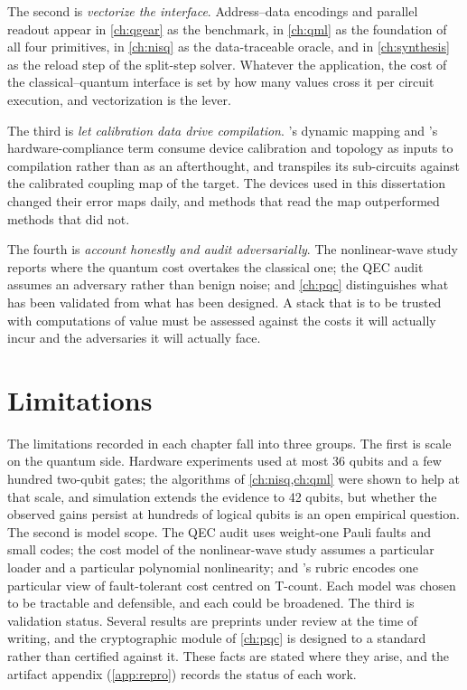 The second is \emph{vectorize the interface}. Address--data encodings and parallel readout appear in \cref{ch:qgear} as the \qcrank{} benchmark, in \cref{ch:qml} as the foundation of all four primitives, in \cref{ch:nisq} as the data-traceable oracle, and in \cref{ch:synthesis} as the reload step of the split-step solver. Whatever the application, the cost of the classical--quantum interface is set by how many values cross it per circuit execution, and vectorization is the lever.

The third is \emph{let calibration data drive compilation}. \deal's dynamic mapping and \rubriq's hardware-compliance term consume device calibration and topology as inputs to compilation rather than as an afterthought, and \shardq{} transpiles its sub-circuits against the calibrated coupling map of the target. The devices used in this dissertation changed their error maps daily, and methods that read the map outperformed methods that did not.

The fourth is \emph{account honestly and audit adversarially}. The nonlinear-wave study reports where the quantum cost overtakes the classical one; the QEC audit assumes an adversary rather than benign noise; and \cref{ch:pqc} distinguishes what has been validated from what has been designed. A stack that is to be trusted with computations of value must be assessed against the costs it will actually incur and the adversaries it will actually face.

\section{Limitations}\label{sec:conclusion:limitations}

The limitations recorded in each chapter fall into three groups. The first is scale on the quantum side. Hardware experiments used at most 36 qubits and a few hundred two-qubit gates; the algorithms of \cref{ch:nisq,ch:qml} were shown to help at that scale, and simulation extends the evidence to 42 qubits, but whether the observed gains persist at hundreds of logical qubits is an open empirical question. The second is model scope. The QEC audit uses weight-one Pauli faults and small codes; the cost model of the nonlinear-wave study assumes a particular loader and a particular polynomial nonlinearity; and \rubriq's rubric encodes one particular view of fault-tolerant cost centred on T-count. Each model was chosen to be tractable and defensible, and each could be broadened. The third is validation status. Several results are preprints under review at the time of writing, and the cryptographic module of \cref{ch:pqc} is designed to a standard rather than certified against it. These facts are stated where they arise, and the artifact appendix (\cref{app:repro}) records the status of each work.

